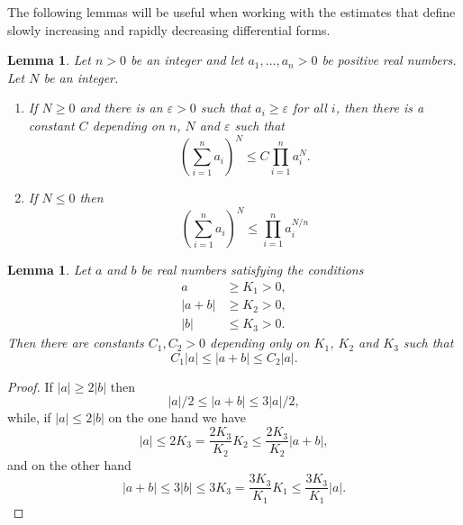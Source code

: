 \documentclass[11pt,a4paper]{amsart}
\numberwithin{equation}{section}
\theoremstyle{plain}
\newtheorem{lem}[prop]{Lemma}
\theoremstyle{definition}
\begin{document}
The following lemmas will be useful when working with the estimates
that define slowly increasing and rapidly decreasing differential
forms.

\begin{lem}\label{lemm:3} Let $n>0$ be an integer and let
  $a_1,\dots,a_n> 0$ be positive real numbers. Let $N$ be an
  integer.
  \begin{enumerate}
  \item\label{item:9} If $N\ge 0$ and there is an $\varepsilon >0$ such that $a_i\ge
    \varepsilon $ for all $i$, then there is a constant $C$ depending
    on $n$, $N$ and $\varepsilon $ such that
    \begin{displaymath}
      \left( \sum_{i=1}^{n} a_i\right)^N\le C
      \prod_{i=1}^{n} a_{i}^{N}.
    \end{displaymath}
  \item\label{item:10} If $N\le 0$ then
    \begin{displaymath}
      \left( \sum_{i=1}^{n} a_i\right)^N\le 
      \prod_{i=1}^{n} a_{i}^{N/n}
    \end{displaymath}
  \end{enumerate}
\end{lem}

\begin{lem}\label{lemm:6}
  Let $a$ and $b$ be real numbers satisfying the conditions
  \begin{align}
    a &\ge K_1 >0,\label{eq:32}\\
    |a+b| &\ge K_2 >0,\label{eq:36}\\
    |b|  &\le K_3>0.\label{eq:38}
  \end{align}
  Then there are constants $C_1,C_2>0$ depending only on $K_1$, $K_2$
  and $K_3$ such that
  \begin{displaymath}
    C_1|a| \le |a+b| \le C_2 |a|.
  \end{displaymath}
\end{lem}
\begin{proof}
  If $|a|\ge 2|b|$ then
  \begin{displaymath}
    |a|/2\le |a+b| \le 3|a|/2,
  \end{displaymath}
  while, if $|a|\le 2|b|$ on the one hand we have
  \begin{displaymath}
    |a| \le 2 K_3 = \frac {2K_3}{K_2}K_2\le \frac {2K_3}{K_2}|a+b|, 
  \end{displaymath}
  and on the other hand
  \begin{displaymath}
    |a+b|\le 3|b| \le 3K_3=\frac{3K_3}{K_1} K_1 \le \frac{3K_3}{K_1}|a|. 
  \end{displaymath}
\end{proof}
\end{document}
